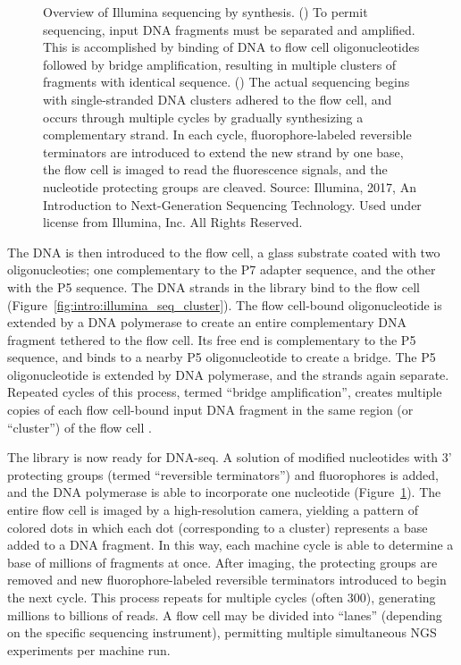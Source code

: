\begin{figure}[htb]
\begin{subfigure}{0.45\textwidth}
        \caption{}\label{fig:intro:illumina_seq_seq}
    \end{subfigure}%
    \hspace{0.5cm}
	\vspace{-0.3cm}
    \caption[Overview of Illumina sequencing by synthesis.]{Overview of Illumina sequencing by synthesis. () To permit sequencing, input DNA fragments must be separated and amplified. This is accomplished by binding of DNA to flow cell oligonucleotides followed by bridge amplification, resulting in multiple clusters of fragments with identical sequence. () The actual sequencing begins with single-stranded DNA clusters adhered to the flow cell, and occurs through multiple cycles by gradually synthesizing a complementary strand. In each cycle, fluorophore-labeled reversible terminators are introduced to extend the new strand by one base, the flow cell is imaged to read the fluorescence signals, and the nucleotide protecting groups are cleaved. Source: Illumina, 2017, An Introduction to Next-Generation Sequencing Technology. Used under license from Illumina, Inc. All Rights Reserved.}
    \label{fig:intro:illumina_seq}
\end{figure}
The DNA is then introduced to the flow cell, a glass substrate coated with two oligonucleoties; one complementary to the P7 adapter sequence, and the other with the P5 sequence. The DNA strands in the library bind to the flow cell (Figure~\ref{fig:intro:illumina_seq_cluster}). The flow cell-bound oligonucleotide is extended by a DNA polymerase to create an entire complementary DNA fragment tethered to the flow cell. Its free end is complementary to the P5 sequence, and binds to a nearby P5 oligonucleotide to create a bridge. The P5 oligonucleotide is extended by DNA polymerase, and the strands again separate. Repeated cycles of this process, termed ``bridge amplification'', creates multiple copies of each flow cell-bound input DNA fragment in the same region (or ``cluster'') of the flow cell \cite{buermans2014}.

The library is now ready for DNA-seq. A solution of modified nucleotides with 3' protecting groups (termed ``reversible terminators'') and fluorophores is added, and the DNA polymerase is able to incorporate one nucleotide  (Figure~\ref{fig:intro:illumina_seq_seq}). The entire flow cell is imaged by a high-resolution camera, yielding a pattern of colored dots in which each dot (corresponding to a cluster) represents a base added to a DNA fragment. In this way, each machine cycle is able to determine a base of millions of fragments at once. After imaging, the protecting groups are removed and new fluorophore-labeled reversible terminators introduced to begin the next cycle. This process repeats for multiple cycles (often 300), generating millions to billions of reads. A flow cell may be divided into ``lanes'' (depending on the specific sequencing instrument), permitting multiple simultaneous NGS experiments per machine run.

